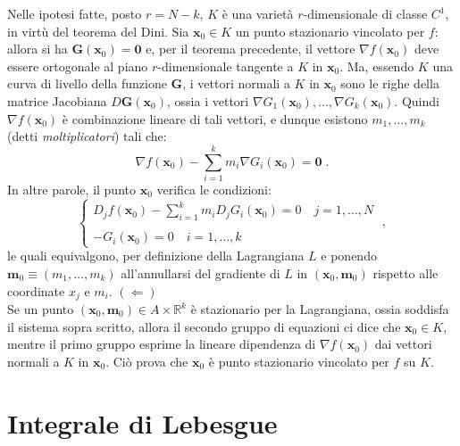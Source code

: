 \documentclass[a4paper,12pt]{report}
\theoremstyle{plain}
\theoremstyle{definition}
\theoremstyle{remark}
\numberwithin{equation}{section}
\begin{document}
Nelle ipotesi fatte, posto $r=N-k$, $K$ è una varietà $r$-dimensionale di classe $C^1$, in virtù del teorema del Dini. Sia $\mathbf{x}_0 
\in K$ un punto stazionario vincolato per $f$: allora si ha $\mathbf{G}(\mathbf{x}_0)=\mathbf{0}$ e, per il teorema precedente, il vettore
 $\nabla f(\mathbf{x}_0)$ deve essere ortogonale al piano $r$-dimensionale tangente a $K$ in $\mathbf{x}_0$. Ma, essendo $K$ una curva di livello della funzione $\mathbf{G}$, i vettori normali a $K$ in $\mathbf{x}_0$ sono le righe della matrice Jacobiana $D\mathbf{G}(\mathbf{x}_0)$, ossia i vettori $\nabla G_1(\mathbf{x}_0),\ldots,\nabla G_k(\mathbf{x}_0)$. Quindi $\nabla f(\mathbf{x}_0)$ è combinazione lineare di tali vettori, e dunque esistono $m_1,\ldots,m_k$ (detti \textit{moltiplicatori}) tali che:
\begin{equation}
\nabla f(\mathbf{x}_0)-\sum_{i=1}^k m_i\nabla G_i(\mathbf{x}_0)=\mathbf{0}\;.
\end{equation}
In altre parole, il punto $\mathbf{x}_0$ verifica le condizioni:
\begin{equation}
\begin{cases}
 D_jf(\mathbf{x}_0)-\displaystyle{\sum_{i=1}^k m_iD_jG_i(\mathbf{x}_0)}=0 \quad j=1,\ldots,N \\
 \\
-G_i(\mathbf{x}_0)=0 \quad i=1,\ldots,k
\end{cases}\;,
\end{equation}
le quali equivalgono, per definizione della Lagrangiana $L$ e ponendo $\mathbf{m}_0 \equiv (m_1,\ldots,m_k)$ all'annullarsi del gradiente 
di $L$ in $(\mathbf{x}_0,\mathbf{m}_0)$ rispetto alle coordinate $x_j$ e $m_i$.
\endproof
\proof $(\Longleftarrow)$ \\
Se un punto $(\mathbf{x}_0,\mathbf{m}_0) \in A \times \mathbb{R}^k$ è stazionario per la Lagrangiana, ossia soddisfa il sistema sopra 
scritto, allora il secondo gruppo di equazioni ci dice che $\mathbf{x}_0 \in K$, mentre il primo gruppo esprime la lineare dipendenza di 
$\nabla f(\mathbf{x}_0)$ dai vettori normali a $K$ in $\mathbf{x}_0$. Ciò prova che $\mathbf{x}_0$ è punto stazionario vincolato per $f$ 
su $K$.
\endproof
\chapter{Integrale di Lebesgue}
\end{document}
